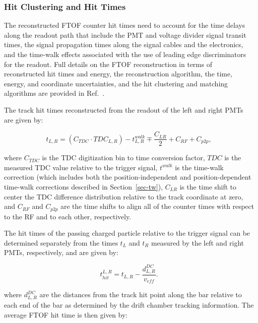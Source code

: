 \documentclass{elsart}
\begin{document}
\subsubsection{Hit Clustering and Hit Times}
\label{cluster}

The reconstructed FTOF counter hit times need to account for the time delays along the readout
path that include the PMT and voltage divider signal transit times, the signal propagation times along
the signal cables and the electronics, and the time-walk effects associated with the use of leading edge
discriminators for the readout. Full details on the FTOF reconstruction in terms of reconstructed hit
times and energy, the reconstruction algorithm, the time, energy, and coordinate uncertainties, and
the hit clustering and matching algorithms are provided in Ref.~\cite{ftof-recon}.

The track hit times reconstructed from the readout of the left and right PMTs are given by:

\begin{equation}
t_{L,R} = (C_{TDC} \cdot TDC_{L,R}) - t_{L,R}^{walk} \mp \frac{C_{LR}}{2} + C_{RF} + C_{p2p},
\end{equation}

\noindent
where $C_{TDC}$ is the TDC digitization bin to time conversion factor, $TDC$ is the measured TDC value
relative to the trigger signal, $t^{walk}$ is the time-walk correction (which includes both the
position-independent and position-dependent time-walk corrections described in Section~\ref{sec-tw}),
$C_{LR}$ is the time shift to center the TDC difference distribution relative to the track coordinate at zero,
and $C_{RF}$ and $C_{p2p}$ are the time shifts to align all of the counter times with respect to the RF and to
each other, respectively.

The hit times of the passing charged particle relative to the trigger signal can be determined separately 
from the times $t_L$ and $t_R$ measured by the left and right PMTs, respectively, and are given by:

\begin{equation}
\label{thit-1}
t_{hit}^{L,R} = t_{L,R} - \frac{d^{DC}_{L,R}}{v_{eff}}.
\end{equation}

\noindent
where $d^{DC}_{L,R}$ are the distances from the track hit point along the bar relative to each end of the
bar as determined by the drift chamber tracking information. The average FTOF hit time is then given by:
\end{document}

